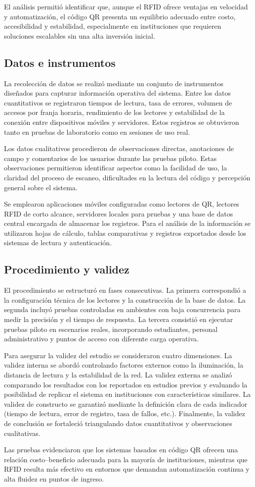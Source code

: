 El análisis permitió identificar que, aunque el RFID ofrece ventajas en velocidad y automatización, el código QR presenta un equilibrio adecuado entre costo, accesibilidad y estabilidad, especialmente en instituciones que requieren soluciones escalables sin una alta inversión inicial.

\subsection{Datos e instrumentos}
La recolección de datos se realizó mediante un conjunto de instrumentos diseñados para capturar información operativa del sistema. Entre los datos cuantitativos se registraron tiempos de lectura, tasa de errores, volumen de accesos por franja horaria, rendimiento de los lectores y estabilidad de la conexión entre dispositivos móviles y servidores. Estos registros se obtuvieron tanto en pruebas de laboratorio como en sesiones de uso real.

Los datos cualitativos procedieron de observaciones directas, anotaciones de campo y comentarios de los usuarios durante las pruebas piloto. Estas observaciones permitieron identificar aspectos como la facilidad de uso, la claridad del proceso de escaneo, dificultades en la lectura del código y percepción general sobre el sistema.

Se emplearon aplicaciones móviles configuradas como lectores de QR, lectores RFID de corto alcance, servidores locales para pruebas y una base de datos central encargada de almacenar los registros. Para el análisis de la información se utilizaron hojas de cálculo, tablas comparativas y registros exportados desde los sistemas de lectura y autenticación.

\subsection{Procedimiento y validez}
El procedimiento se estructuró en fases consecutivas. La primera correspondió a la configuración técnica de los lectores y la construcción de la base de datos. La segunda incluyó pruebas controladas en ambientes con baja concurrencia para medir la precisión y el tiempo de respuesta. La tercera consistió en ejecutar pruebas piloto en escenarios reales, incorporando estudiantes, personal administrativo y puntos de acceso con diferente carga operativa.

Para asegurar la validez del estudio se consideraron cuatro dimensiones. La validez interna se abordó controlando factores externos como la iluminación, la distancia de lectura y la estabilidad de la red. La validez externa se analizó comparando los resultados con los reportados en estudios previos y evaluando la posibilidad de replicar el sistema en instituciones con características similares. La validez de constructo se garantizó mediante la definición clara de cada indicador (tiempo de lectura, error de registro, tasa de fallos, etc.). Finalmente, la validez de conclusión se fortaleció triangulando datos cuantitativos y observaciones cualitativas.

Las pruebas evidenciaron que los sistemas basados en código QR ofrecen una relación costo–beneficio adecuada para la mayoría de instituciones, mientras que RFID resulta más efectivo en entornos que demandan automatización continua y alta fluidez en puntos de ingreso.
